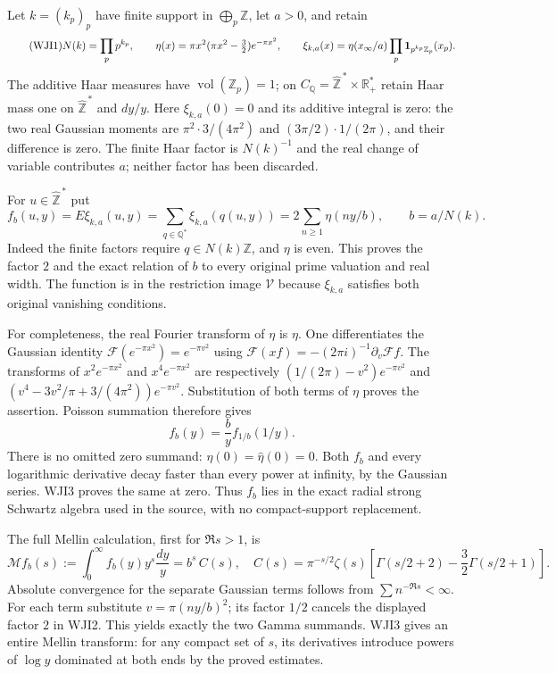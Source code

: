 \documentclass[11pt]{article}
\begin{document}
Let $k=(k_p)_p$ have finite support in $\bigoplus_p\mathbb Z$,
let $a>0$, and retain
\begin{equation}\tag{WJI1}
 N(k)=\prod_p p^{k_p},\qquad
 \eta(x)=\pi x^2(\pi x^2-\tfrac32)e^{-\pi x^2},\qquad
 \xi_{k,a}(x)=\eta(x_\infty/a)
                     \prod_p{\bf1}_{p^{k_p}\mathbb Z_p}(x_p).
\end{equation}
The additive Haar measures have
$\operatorname{vol}(\mathbb Z_p)=1$; on
$C_{\mathbb Q}=\widehat{\mathbb Z}^{\,*}\times\mathbb R_+^*$
retain Haar mass one on $\widehat{\mathbb Z}^{\,*}$ and $dy/y$.
Here $\xi_{k,a}(0)=0$ and its additive integral is zero:
the two real Gaussian moments are
$\pi^2\cdot3/(4\pi^2)$ and $(3\pi/2)\cdot1/(2\pi)$,
and their difference is zero. The finite Haar factor is
$N(k)^{-1}$ and the real change of variable contributes $a$;
neither factor has been discarded.

For $u\in\widehat{\mathbb Z}^{\,*}$ put
\begin{equation}\tag{WJI2}
 f_b(u,y)=E\xi_{k,a}(u,y)
   =\sum_{q\in\mathbb Q^*}\xi_{k,a}(q(u,y))
   =2\sum_{n\ge1}\eta(ny/b),\qquad b=a/N(k).
\end{equation}
Indeed the finite factors require $q\in N(k)\mathbb Z$,
and $\eta$ is even. This proves the factor $2$ and the exact
relation of $b$ to every original prime valuation and real width.
The function is in the restriction image $\mathcal V$ because
$\xi_{k,a}$ satisfies both original vanishing conditions.

For completeness, the real Fourier transform of $\eta$ is $\eta$.
One differentiates the Gaussian identity
$\mathcal F(e^{-\pi x^2})=e^{-\pi v^2}$ using
$\mathcal F(xf)=-(2\pi i)^{-1}\partial_v\mathcal Ff$.
The transforms of $x^2e^{-\pi x^2}$ and $x^4e^{-\pi x^2}$
are respectively
$(1/(2\pi)-v^2)e^{-\pi v^2}$ and
$(v^4-3v^2/\pi+3/(4\pi^2))e^{-\pi v^2}$.
Substitution of both terms of $\eta$ proves the assertion.
Poisson summation therefore gives
\begin{equation}\tag{WJI3}
 f_b(y)=\frac b y f_{1/b}(1/y).
\end{equation}
There is no omitted zero summand: $\eta(0)=\widehat\eta(0)=0$.
Both $f_b$ and every logarithmic derivative decay faster than
every power at infinity, by the Gaussian series. WJI3 proves
the same at zero. Thus $f_b$ lies in the exact radial strong
Schwartz algebra used in the source, with no compact-support
replacement.

The full Mellin calculation, first for $\Re s>1$, is
\begin{equation}\tag{WJI4}
 \mathcal Mf_b(s):=\int_0^\infty f_b(y)y^s\frac{dy}{y}
 =b^s\,C(s),\quad
 C(s)=\pi^{-s/2}\zeta(s)
       \left[\Gamma(s/2+2)-\frac32\Gamma(s/2+1)\right].
\end{equation}
Absolute convergence for the separate Gaussian terms follows
from $\sum n^{-\Re s}<\infty$. For each term substitute
$v=\pi(ny/b)^2$; its factor $1/2$ cancels the displayed
factor $2$ in WJI2. This yields exactly the two Gamma summands.
WJI3 gives an entire Mellin transform: for any compact set of
$s$, its derivatives introduce powers of $\log y$ dominated
at both ends by the proved estimates.
\end{document}
